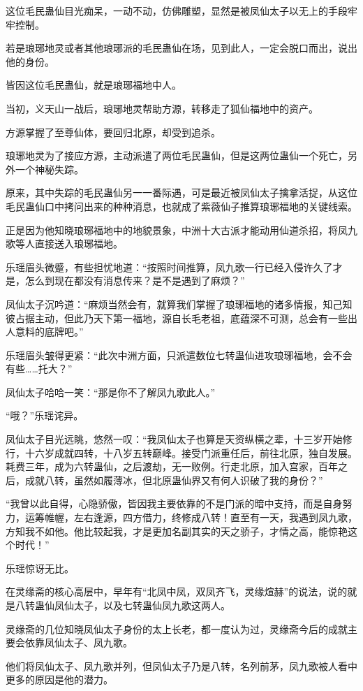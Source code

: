 \begin{this_body}
这位毛民蛊仙目光痴呆，一动不动，仿佛雕塑，显然是被凤仙太子以无上的手段牢牢控制。

若是琅琊地灵或者其他琅琊派的毛民蛊仙在场，见到此人，一定会脱口而出，说出他的身份。

皆因这位毛民蛊仙，就是琅琊福地中人。

当初，义天山一战后，琅琊地灵帮助方源，转移走了狐仙福地中的资产。

方源掌握了至尊仙体，要回归北原，却受到追杀。

琅琊地灵为了接应方源，主动派遣了两位毛民蛊仙，但是这两位蛊仙一个死亡，另外一个神秘失踪。

原来，其中失踪的毛民蛊仙另一一番际遇，可是最近被凤仙太子擒拿活捉，从这位毛民蛊仙口中拷问出来的种种消息，也就成了紫薇仙子推算琅琊福地的关键线索。

正是因为他知晓琅琊福地中的地貌景象，中洲十大古派才能动用仙道杀招，将凤九歌等人直接送入琅琊福地。

乐瑶眉头微蹙，有些担忧地道：“按照时间推算，凤九歌一行已经入侵许久了才是，怎么到现在都没有消息传来？是不是遇到了麻烦？”

凤仙太子沉吟道：“麻烦当然会有，就算我们掌握了琅琊福地的诸多情报，知己知彼占据主动，但此乃天下第一福地，源自长毛老祖，底蕴深不可测，总会有一些出人意料的底牌吧。”

乐瑶眉头皱得更紧：“此次中洲方面，只派遣数位七转蛊仙进攻琅琊福地，会不会有些……托大？”

凤仙太子哈哈一笑：“那是你不了解凤九歌此人。”

“哦？”乐瑶诧异。

凤仙太子目光远眺，悠然一叹：“我凤仙太子也算是天资纵横之辈，十三岁开始修行，十六岁成就四转，十八岁五转巅峰。接受门派重任后，前往北原，独自发展。耗费三年，成为六转蛊仙，之后渡劫，无一败例。行走北原，加入宫家，百年之后，成就八转，虽然如履薄冰，但北原蛊仙界又有何人识破了我的身份？”

“我曾以此自得，心隐骄傲，皆因我主要依靠的不是门派的暗中支持，而是自身努力，运筹帷幄，左右逢源，四方借力，终修成八转！直至有一天，我遇到凤九歌，方知我不如他。他比较起我，才是更加名副其实的天之骄子，才情之高，能惊艳这个时代！”

乐瑶惊讶无比。

在灵缘斋的核心高层中，早年有“北凤中凤，双凤齐飞，灵缘煊赫”的说法，说的就是八转蛊仙凤仙太子，以及七转蛊仙凤九歌这两人。

灵缘斋的几位知晓凤仙太子身份的太上长老，都一度认为过，灵缘斋今后的成就主要会依靠凤仙太子、凤九歌。

他们将凤仙太子、凤九歌并列，但凤仙太子乃是八转，名列前茅，凤九歌被人看中更多的原因是他的潜力。


\end{this_body}
